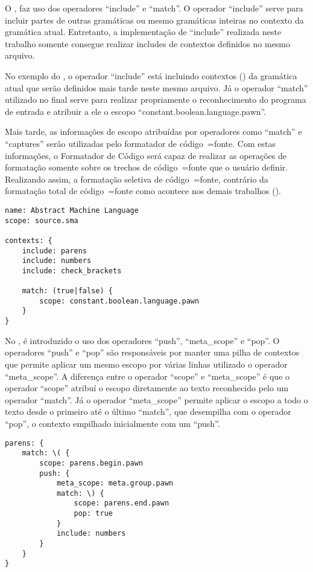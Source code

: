 O ,
faz uso dos operadores ``include'' e
``match''.
O operador ``include'' serve para incluir partes de outras gramáticas ou
mesmo gramáticas inteiras no contexto da gramática atual.
Entretanto,
a implementação de ``include'' realizada neste trabalho somente consegue realizar includes de contextos definidos no mesmo arquivo.

No exemplo do ,
o operador ``include'' está incluindo contextos () da gramática atual que serão definidos mais tarde neste mesmo arquivo.
Já o operador ``match'' utilizado no final serve para realizar propriamente o reconhecimento do programa de entrada e
atribuir a ele o escopo ``constant.boolean.language.pawn''.

Mais tarde,
as informações de escopo atribuídas por operadores como ``match'' e
``captures'' serão utilizadas pelo formatador de código~=fonte.
Com estas informações,
o Formatador de Código será capaz de realizar as operações de formatação somente sobre os trechos de código~=fonte que o usuário definir.
Realizando assim,
a formatação seletiva de código~=fonte,
contrário da formatação total de código~=fonte como acontece nos demais trabalhos ().
\begin{lstlisting}[caption={Exemplo de Gramática, Símbolo Inicial},label={exemploDeGramaticaPawn1},style=yaml_style]
name: Abstract Machine Language
scope: source.sma

contexts: {
    include: parens
    include: numbers
    include: check_brackets

    match: (true|false) {
        scope: constant.boolean.language.pawn
    }
}
\end{lstlisting}

No ,
é introduzido o uso dos operadores ``push'',
``meta\_scope'' e
``pop''.
O operadores ``push'' e
``pop'' são responsáveis por manter uma pilha de contextos que permite aplicar um mesmo escopo por várias linhas utilizado o operador ``meta\_scope''.
A diferença entre o operador ``scope'' e
``meta\_scope'' é que o operador ``scope'' atribuí o escopo diretamente ao texto reconhecido pelo um operador ``match''.
Já o operador ``meta\_scope'' permite aplicar o escopo a todo o texto desde o primeiro até o último ``match'',
que desempilha com o operador ``pop'',
o contexto empilhado inicialmente com um ``push''.
\begin{lstlisting}[caption={Exemplo de Gramática, Contextos},label={exemploDeGramaticaPawn2},style=yaml_style]
parens: {
    match: \( {
        scope: parens.begin.pawn
        push: {
            meta_scope: meta.group.pawn
            match: \) {
                scope: parens.end.pawn
                pop: true
            }
            include: numbers
        }
    }
}
\end{lstlisting}

